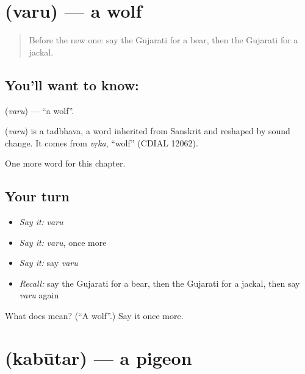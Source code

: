 \section[\texorpdfstring{\gu{વરુ} (varu)}{વરુ (varu)}]{ (varu) — a wolf}

\label{lesson:GU-C122-varu}



\begin{quote}
Before the new one: say the Gujarati for a bear, then the Gujarati for a jackal.
\end{quote}

\subsection*{You'll want to know: }
\textbf{} (\emph{varu}) — \textquotedblleft{}a wolf\textquotedblright{}.

\begin{cousinweb}
\textbf{} (\emph{varu}) is a tadbhava, a word inherited from Sanskrit and reshaped by sound change. It comes from \emph{vṛka}, \textquotedblleft{}wolf\textquotedblright{} (CDIAL 12062).
\end{cousinweb}

\begin{grammarlens}[title={What you've built}]
One more word for this chapter.
\end{grammarlens}

\subsection*{Your turn}
\begin{itemize}
\raggedright
  \item \emph{Say it:} \emph{varu}
  \item \emph{Say it:} \emph{varu}, once more
  \item \emph{Say it:} say \emph{varu}
  \item \emph{Recall:} say the Gujarati for a bear, then the Gujarati for a jackal, then say \emph{varu} again
\end{itemize}

\begin{tcolorbox}[breakable,colback=teal!4,colframe=teal!35!black,title={Before you move on}]
What does  mean? (\textquotedblleft{}A wolf\textquotedblright{}.) Say it once more.
\end{tcolorbox}
\section[\texorpdfstring{\gu{કબૂતર} (kabūtar)}{કબૂતર (kabūtar)}]{ (kabūtar) — a pigeon}

